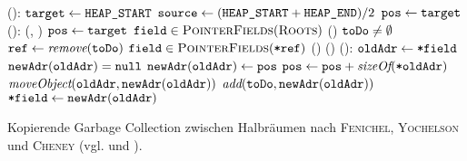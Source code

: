\begin{algorithm}[h]
\begin{algorithmic}[1]
	\State {}():
	\State \quad $\texttt{target} \gets \texttt{HEAP\_START}$		
	\State \quad $\texttt{source} \gets (\texttt{HEAP\_START} + \texttt{HEAP\_END}) / 2$		
	\State \quad $\texttt{pos} \gets \texttt{target}$		
	\Statex
	\State \Atomic {}():
	\State \quad {}(, )		
	\State \quad $\texttt{pos} \gets \texttt{target}$
	\State \quad \FOREACH $\texttt{field} \in \textsc{PointerFields}(\textsc{Roots})$		
	\State \quad \quad {}()		
	\State \quad \WHILE $\texttt{toDo} \neq \emptyset$		
	\State \quad \quad $\texttt{ref} \gets \textit{remove}(\texttt{toDo})$	
	\State \quad \quad \FOREACH $\texttt{field} \in \textsc{PointerFields}(\texttt{*ref})$
	\State \quad \quad \quad {}()	
	\State \quad {}()
	\Statex
	\State {}():
	\State \quad $\texttt{oldAdr} \gets \texttt{*field}$		
	\State \quad \IF $\texttt{newAdr}(\texttt{oldAdr}) = \texttt{null}$	
	\State \quad \quad $\texttt{newAdr}(\texttt{oldAdr}) \gets \texttt{pos}$		
	\State \quad \quad $\texttt{pos} \gets \texttt{pos} + \textit{sizeOf}(\texttt{*oldAdr})$	
	\State \quad \quad $\textit{moveObject}(\texttt{oldAdr}, \texttt{newAdr}(\texttt{oldAdr}))$ 
	\State \quad \quad $\textit{add}(\texttt{toDo}, \texttt{newAdr}(\texttt{oldAdr}))$	
	\State \quad $\texttt{*field} \gets \texttt{newAdr}(\texttt{oldAdr})$	
\end{algorithmic}
\caption[Kopierende Garbage Collection nach \textsc{Fenichel}, \textsc{Yochelson}, \textsc{Cheney}]{Kopierende Garbage Collection zwischen Halbräumen nach \textsc{Fenichel}, \textsc{Yochelson} und \textsc{Cheney} (vgl. \cite{fenichel1969} und \cite{cheney1970}).}
\label{algo:copying-gc}
\end{algorithm}

